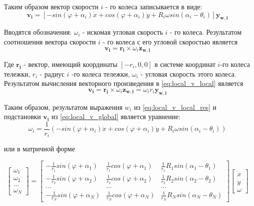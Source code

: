 \documentclass[oneside,final,14pt]{extreport}
\newcommand{\bs}{\boldsymbol}
\begin{document}
Таким образом вектор скорости $i$ - го колеса записывается в виде:
\begin{equation}
\label{eq:local_v_global}
\bs{v_{i}}
=
[
-sin(\varphi +\alpha_{i})\dot{x}
+cos(\varphi +\alpha_{i})\dot{y}
+
R_{i}
\omega
sin(\alpha_{i} - \theta_{i})
]
\bs{y_{w,i}}
\end{equation}



Вводятся обозначения: $\omega_{i}$ - искомая угловая скорость $i$ - го колеса.
Результатом соотношения вектора скорости $i$ - го колеса с его угловой скоростью является
\begin{equation}
\label{eq:local_v_local}
\bs{v_{i}}
=
\bs{r_{i}}
\times
\omega_{i}
\bs{z_{w,i}}
\end{equation}

Где $\bs{r_{i}}$  - вектор, имеющий координаты $[-r_{i},0,0]$ в системе координат $i$-го колеса тележки, $r_{i}$ - радиус $i$ -го колеса тележки, $\omega_{i}$ - угловая скорость этого колеса.
Результатом вычисления векторного произведения в \ref{eq:local_v_local} является 
\begin{equation}
\label{eq:local_v_local_res}
\bs{v_{i}}
=
\bs{r_{i}}
\times
\omega_{i}
\bs{z_{w,i}}
=
\omega_{i}
r_{i}
\bs{y_{w,i}}
\end{equation}

Таким образом, результатом выражения  $w_{i}$ из \ref{eq:local_v_local_res} и подстановки $\bs{v_{i}}$ из \ref{eq:local_v_global} является уравнение:
\begin{equation}
\omega_{i}
=
\frac{1}{r_{i}}
(
-sin(\varphi +\alpha_{i})\dot{x}
+cos(\varphi +\alpha_{i})\dot{y}
+
R_{i}
\omega
sin(\alpha_{i} - \theta_{i})
)
\end{equation}

или в матричной форме 

\begin{equation}
\label{eq:kinematic_omniwheel_res}
\begin{bmatrix}
\omega_{1} \\
\omega_{2} \\
...\\
\omega_{N}
\end{bmatrix}
=
\begin{bmatrix}
-\frac{1}{r_{1}}sin(\varphi +\alpha_{1}) &
\frac{1}{r_{1}}cos(\varphi +\alpha_{1}) &
\frac{1}{r_{1}}R_{1}sin(\alpha_{1} - \theta_{1})
\\
-\frac{1}{r_{2}}sin(\varphi +\alpha_{2}) &
\frac{1}{r_{2}}cos(\varphi +\alpha_{2}) &
\frac{1}{r_{2}}R_{2}sin(\alpha_{2} - \theta_{2})
\\
... & ... & ...
\\
-\frac{1}{r_{N}}sin(\varphi +\alpha_{N}) &
\frac{1}{r_{N}}cos(\varphi +\alpha_{N}) &
\frac{1}{r_{N}}R_{N}sin(\alpha_{N} - \theta_{N})
\end{bmatrix}
\begin{bmatrix}
\dot{x} \\
\dot{y} \\
\omega
\end{bmatrix}
\end{equation}
\end{document}
